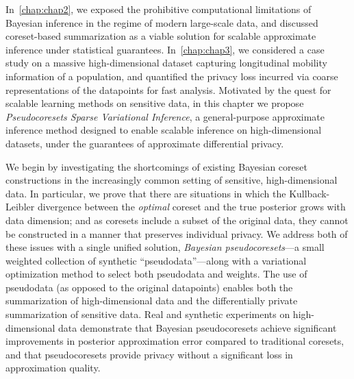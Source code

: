 In~\cref{chap:chap2}, we exposed the prohibitive computational limitations of Bayesian inference in the regime of modern large-scale data, and discussed coreset-based summarization as a viable solution for scalable approximate inference under statistical guarantees. In~\cref{chap:chap3}, we considered a case study on a massive high-dimensional dataset capturing longitudinal mobility information of a population, and quantified the privacy loss incurred via coarse representations of the datapoints for fast analysis.
Motivated by the quest for scalable learning methods on sensitive data, in this chapter we propose \emph{Pseudocoresets Sparse Variational Inference}, a general-purpose approximate inference method designed to enable scalable inference on high-dimensional datasets, under the guarantees of approximate differential privacy.

We begin by investigating the shortcomings of existing Bayesian coreset constructions 
in the increasingly common setting of sensitive, high-dimensional data. 
In particular, we prove that there are situations in which 
the Kullback-Leibler divergence between the \emph{optimal} coreset 
and the true posterior grows with data dimension; and as coresets include
a subset of the original data, they cannot be constructed in a manner
that preserves individual privacy.
We address both of these issues with a single unified solution, \emph{Bayesian
pseudocoresets}---a small weighted collection of synthetic
``pseudodata''---along with a variational optimization method to select both
pseudodata and weights.  The use of pseudodata (as opposed to
the original datapoints) enables both the summarization of high-dimensional data
and the  differentially private summarization of
sensitive data. Real and
synthetic experiments on high-dimensional data demonstrate that Bayesian 
pseudocoresets achieve significant improvements in posterior approximation error compared to
traditional coresets, and that pseudocoresets provide privacy without
a significant loss in approximation quality. 


